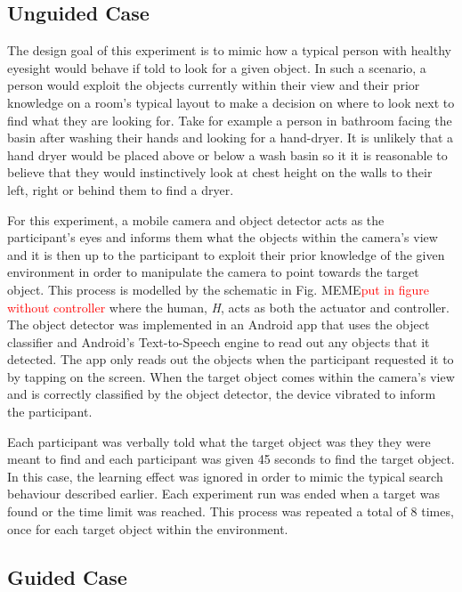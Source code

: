 \documentclass[runningheads]{llncs}
\newcommand\todo[1]{\textcolor{red}{#1}}
\begin{document}
\subsection{Unguided Case}

The design goal of this experiment is to mimic how a typical person with healthy eyesight would behave if told to look for a given object. 
In such a scenario, a person would exploit the objects currently within their view and their prior knowledge on a room's typical layout to make a decision on where to look next to find what they are looking for. 
Take for example a person in bathroom facing the basin after washing their hands and looking for a hand-dryer. 
It is unlikely that a hand dryer would be placed above or below a wash basin so it it is reasonable to believe that they would instinctively look at chest height on the walls to their left, right or behind them to find a dryer. 

For this experiment, a mobile camera and object detector acts as the participant's eyes and informs them what the objects within the camera's view and it is then up to the participant to exploit their prior knowledge of the given environment in order to manipulate the camera to point towards the target object. 
This process is modelled by the schematic in Fig. MEME\todo{put in figure without controller} where the human, \emph{H}, acts as both the actuator and controller.
The object detector was implemented in an Android app that uses the object classifier and Android's Text-to-Speech engine to read out any objects that it detected. 
The app only reads out the objects when the participant requested it to by tapping on the screen. 
When the target object comes within the camera's view and is correctly classified by the object detector, the device vibrated to inform the participant. 

Each participant was verbally told what the target object was they they were meant to find and each participant was given 45 seconds to find the target object. 
In this case, the learning effect was ignored in order to mimic the typical search behaviour described earlier. 
Each experiment run was ended when a target was found or the time limit was reached. 
This process was repeated a total of 8 times, once for each target object within the environment. 

\subsection{Guided Case}
\end{document}
